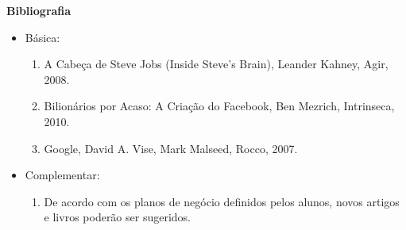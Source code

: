 



\begin{snugshade}\begin{center}\textbf{
    Bibliografia
}\end{center}\end{snugshade}

\begin{itemize} 

  \item Básica:
	\begin{enumerate}
		\item A Cabeça de Steve Jobs (Inside Steve's Brain), Leander Kahney, Agir, 2008.
		\item Bilionários por Acaso: A Criação do Facebook, Ben Mezrich, Intrinseca, 2010.
		\item Google, David A. Vise, Mark Malseed, Rocco, 2007.
	\end{enumerate}
  \item Complementar:
	\begin{enumerate} 
		\item De acordo com os planos de negócio definidos pelos alunos, novos artigos e livros poderão ser sugeridos.
	\end{enumerate}
\end{itemize}
